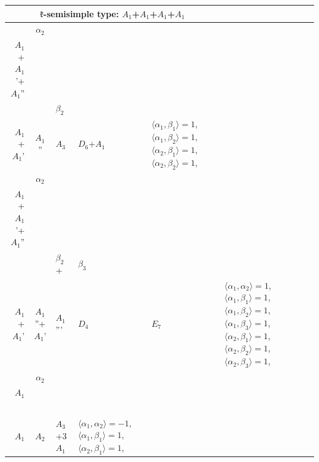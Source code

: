 \documentclass[12pt]{report}
\begin{document}
\begin{appendix}
{\begin{longtable}{rcl p{1cm}p{1cm}p{3cm} }
\\
\hline\multicolumn{5}{c}{$\mathfrak{k}$-semisimple type: $A_1$+$A_1$+$A_1$+$A_1$}\\
\hline\hline\begin{tabular}{cc}$\alpha_1$+ & $\alpha_2$\\\tiny{ $A_1$+$A_1$'+$A_1$'' } & \tiny{  }\end{tabular} &\begin{tabular}{c} = \\~ \end{tabular} & \begin{tabular}{cc}$\beta_1$+ & $\beta_2$\\\tiny{ $A_1$+$A_1$' } & \tiny{ $A_1$'' }\end{tabular} & $A_3$ & $D_6$+$A_1$ &  $\langle\alpha_1, \beta_1\rangle=1$, $\langle\alpha_1, \beta_2\rangle=1$, $\langle\alpha_2, \beta_1\rangle=1$, $\langle\alpha_2, \beta_2\rangle=1$, 
\\
\begin{tabular}{cc}$\alpha_1$+ & $\alpha_2$\\\tiny{ $A_1$+$A_1$'+$A_1$'' } & \tiny{  }\end{tabular} &\begin{tabular}{c} = \\~ \end{tabular} & \begin{tabular}{ccc}$\beta_1$+ & $\beta_2$+ & $\beta_3$\\\tiny{ $A_1$+$A_1$' } & \tiny{ $A_1$''+$A_1$' } & \tiny{ $A_1$''' }\end{tabular} & $D_4$ & $E_7$ & $\langle\alpha_1, \alpha_2\rangle=1$,  $\langle\alpha_1, \beta_1\rangle=1$, $\langle\alpha_1, \beta_2\rangle=1$, $\langle\alpha_1, \beta_3\rangle=1$, $\langle\alpha_2, \beta_1\rangle=1$, $\langle\alpha_2, \beta_2\rangle=1$, $\langle\alpha_2, \beta_3\rangle=1$, 
\\
\begin{tabular}{cc}$\alpha_1$+ & $\alpha_2$\\\tiny{ $A_1$ } & \tiny{  }\end{tabular} &\begin{tabular}{c} = \\~ \end{tabular} & \begin{tabular}{c}$\beta_1$\\\tiny{ $A_1$ }\end{tabular} & $A_2$ & $A_3$+3$A_1$ & $\langle\alpha_1, \alpha_2\rangle=-1$,  $\langle\alpha_1, \beta_1\rangle=1$, $\langle\alpha_2, \beta_1\rangle=1$, 

\end{longtable}}
\end{appendix}
\end{document}
